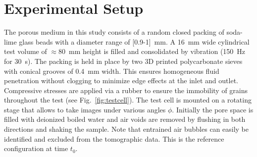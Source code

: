 \documentclass[smallextended]{svjour3}       %
\begin{document}
\section{Experimental Setup}\label{setup}
The porous medium in this study consists of a random closed packing of soda-lime glass beads with a diameter range of [0.9-1]~mm. A 16~mm wide cylindrical test volume of $\approx$80~mm height is filled and consolidated by vibration (150~Hz for 30~s). The packing is held in place by two 3D printed polycarbonate sieves with conical grooves of 0.4~mm width. This ensures homogeneous fluid penetration without clogging to minimize edge effects at the inlet and outlet. Compressive stresses are applied via a rubber to ensure the immobility of grains throughout the test (see Fig.~\ref{fig:testcell}). The test cell is mounted on a rotating stage that allows to take images under various angles $\phi$. Initially the pore space is filled with deionized boiled water and air voids are removed by flushing in both directions and shaking the sample. Note that entrained air bubbles can easily be identified and excluded from the tomographic data. This is the reference configuration at time $t_0$.
\end{document}
